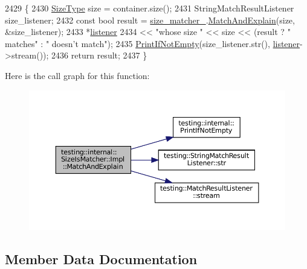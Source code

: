 \begin{DoxyCode}
2429                                                                       \{
2430       \hyperlink{classtesting_1_1internal_1_1SizeIsMatcher_1_1Impl_a5548da0c4c2245ca2fb520f44f0a687a}{SizeType} size = container.size();
2431       StringMatchResultListener size\_listener;
2432       \textcolor{keyword}{const} \textcolor{keywordtype}{bool} result = \hyperlink{classtesting_1_1internal_1_1SizeIsMatcher_1_1Impl_a47227c64c6261eb2bc5a69e2ed9ac921}{size\_matcher\_}.\hyperlink{classtesting_1_1internal_1_1MatcherBase_a08429a6d7e7d330de4a4eb4e272105a7}{MatchAndExplain}(size, &size\_listener);
2433       *\hyperlink{namespaceinteractive__marker_a0e579ab555212bb5e2c9f8a675b7618a}{listener}
2434           << \textcolor{stringliteral}{"whose size "} << size << (result ? \textcolor{stringliteral}{" matches"} : \textcolor{stringliteral}{" doesn't match"});
2435       \hyperlink{namespacetesting_1_1internal_afa4cd5d7933878d6d820b32c87bb2767}{PrintIfNotEmpty}(size\_listener.str(), \hyperlink{namespaceinteractive__marker_a0e579ab555212bb5e2c9f8a675b7618a}{listener}->stream());
2436       \textcolor{keywordflow}{return} result;
2437     \}
\end{DoxyCode}
Here is the call graph for this function\+:
\nopagebreak
\begin{figure}[H]
\begin{center}
\leavevmode
\includegraphics[width=350pt]{classtesting_1_1internal_1_1SizeIsMatcher_1_1Impl_a5180472f5a18b8c0314ed835c52e09d4_cgraph}
\end{center}
\end{figure}


\subsection{Member Data Documentation}
\mbox{\label{classtesting_1_1internal_1_1SizeIsMatcher_1_1Impl_a47227c64c6261eb2bc5a69e2ed9ac921}} 
